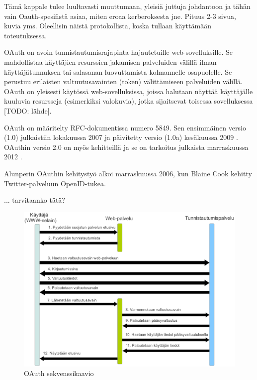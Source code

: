 Tämä kappale tulee luultavasti muuttumaan, yleisiä juttuja johdantoon ja tähän vain Oauth-spesifistä asiaa, miten eroaa kerberoksesta jne. Pituus 2-3 sivua, kuvia yms. Oleellisin näistä protokollista, koska tullaan käyttämään toteutuksessa.

OAuth on avoin tunnistautumisrajapinta hajautetuille web-sovelluksille. Se mahdollistaa käyttäjien resurssien jakamisen palveluiden välillä ilman käyttäjätunnuksen tai salasanan luovuttamista kolmannelle osapuolelle. Se perustuu erilaisten valtuutusavainten (token) välittämiseen palveluiden välillä. OAuth on yleisesti käytössä web-sovelluksissa, joissa halutaan näyttää käyttäjälle kuuluvia resursseja (esimerkiksi valokuvia), jotka sijaitsevat toisessa sovelluksessa [TODO: lähde].

OAuth on määritelty RFC-dokumentissa numero 5849. Sen ensimmäinen versio (1.0) julkaistiin lokakuussa 2007 ja päivitetty versio (1.0a) kesäkuussa 2009 \cite{oauth2_0}. OAuthin versio 2.0 on myös kehitteillä ja se on tarkoitus julkaista marraskuussa 2012 \cite{oauth2_0}.

Alunperin OAuthin kehitystyö alkoi marraskuussa 2006, kun Blaine Cook kehitty Twitter-palveluun OpenID-tukea.

... tarvitaanko tätä?

\begin{figure}[ht]
\centering
\includegraphics[width=\textwidth]{teknologiat/protokollat/oauth.eps}
\caption{OAuth sekvenssikaavio}%
\label{oauth}
\end{figure}
